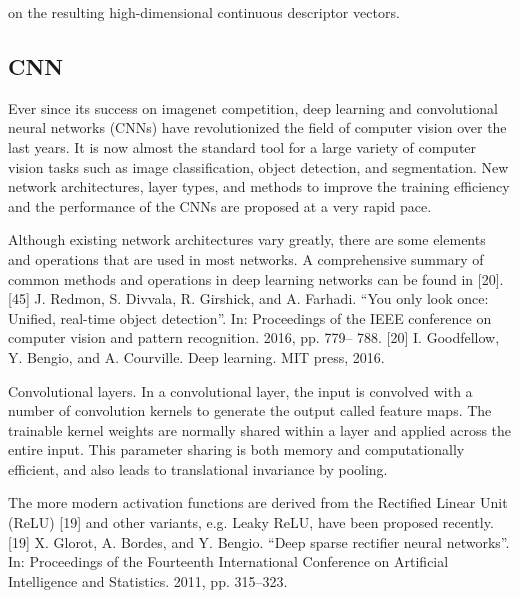 \documentclass[a4paper]{report}
\begin{document}

on the resulting high-dimensional continuous descriptor vectors. 


\subsection{CNN}
Ever since its success on imagenet competition, deep learning and convolutional neural networks (CNNs) have revolutionized the field of computer vision over the last
years. It is now almost the standard tool for a large
variety of computer vision tasks such as image classification, object detection, and segmentation. 
New network architectures, layer types, and methods to improve the training efficiency and the performance of the CNNs are proposed at a very rapid pace.

Although existing network architectures vary greatly, there are some elements and operations that are used in most networks. 
A comprehensive summary of common methods and operations in deep learning networks can be found in [20].
[45] J. Redmon, S. Divvala, R. Girshick, and A. Farhadi. “You only look
once: Unified, real-time object detection”. In: Proceedings of the IEEE
conference on computer vision and pattern recognition. 2016, pp. 779–
788.
[20] I. Goodfellow, Y. Bengio, and A. Courville. Deep learning. MIT press,
2016.


Convolutional layers. In a convolutional layer, the input is convolved with a number of convolution kernels to generate the output called feature maps. The trainable kernel weights are normally shared within a layer and applied across the entire input. This parameter sharing is both memory and computationally efficient, and also leads to translational invariance by pooling.

The more modern activation functions are derived from the Rectified Linear Unit (ReLU) [19] and other variants, e.g. Leaky ReLU, have been proposed recently.
[19] X. Glorot, A. Bordes, and Y. Bengio. “Deep sparse rectifier neural networks”.
In: Proceedings of the Fourteenth International Conference on
Artificial Intelligence and Statistics. 2011, pp. 315–323.
\end{document}
